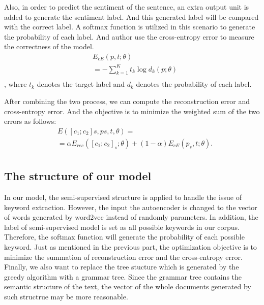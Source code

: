 \documentclass[dvips,9pt]{article}
\begin{document}
Also, in order to predict the sentiment of the sentence, an extra output unit is added to generate the sentiment label. And this generated label will be compared with the correct label. A softmax function is utilized in this scenario to generate the probability of each label. And author use the cross-entropy error to measure the correctness of the model.
\begin{equation}
\begin{split}
 & E_{cE}(p,t;\theta) \\
 & = -\sum_{k=1}^{K}{t_{k}\log{}d_{k}(p;\theta)}\\
 \end{split}
\end{equation}
, where $t_{k}$ denotes the target label and $d_{k}$ denotes the probability of each label.

After combining the two process, we can compute the reconstruction error and cross-entropy error. And the objective is to minimize the weighted sum of the two errors as follows:
\begin{equation}
\begin{split}
 & E([c_{1}; c_{2}]s, ps, t, θ) = \\
 & = \alpha E_{rec}([c_{1}; c_{2}]_{s}; \theta) + (1 - \alpha)E_{cE}(p_{s}, t; \theta).
\\
 \end{split}
\end{equation}



\subsection{The structure of our model}
In our model, the semi-supervised structure is applied to handle the issue of keyword extraction. However, the input the autoencoder is changed to the vector of words generated by word2vec instead of randomly parameters. In addition, the label of semi-supervised model is set as all possible keywords in our corpus. Therefore, the softmax function will generate the probability of each possible keyword. Just as mentioned in the previous part, the optimization objective is to minimize the summation of reconstruction error and the cross-entropy error. Finally, we also want to replace the tree stucture which is generated by the greedy algorithm with a grammar tree. Since the grammar tree contains the semantic structure of the text, the vector of the whole documents generated by such structrue may be more reasonable.
\end{document}
